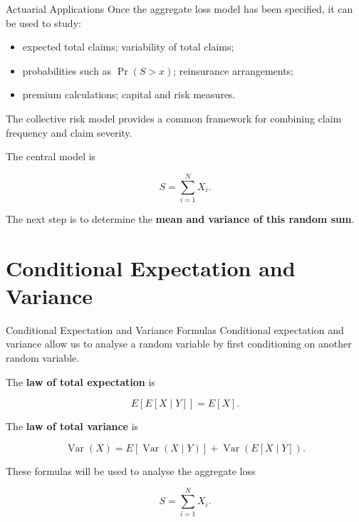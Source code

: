 \documentclass[
  ignorenonframetext,
  aspectratio=169,
]{beamer}
\providecommand{\tightlist}{%
  \setlength{\itemsep}{0pt}\setlength{\parskip}{0pt}}
\begin{document}
\begin{frame}{Actuarial Applications}
\protect{}\label{actuarial-applications}
Once the aggregate loss model has been specified, it can be used to
study:

\begin{itemize}
\tightlist
\item
  expected total claims; variability of total claims;
\item
  probabilities such as \(\Pr(S>x)\); reinsurance arrangements;
\item
  premium calculations; capital and risk measures.
\end{itemize}

The collective risk model provides a common framework for combining
claim frequency and claim severity.

\begin{tcolorbox}[enhanced jigsaw, arc=.35mm, bottomrule=.15mm, bottomtitle=1mm, breakable, colback=white, colbacktitle=quarto-callout-note-color!10!white, colframe=quarto-callout-note-color-frame, coltitle=black, left=2mm, leftrule=.75mm, opacityback=0, opacitybacktitle=0.6, rightrule=.15mm, title=\textcolor{quarto-callout-note-color}{\faInfo}\hspace{0.5em}{Key idea}, titlerule=0mm, toprule=.15mm, toptitle=1mm]

The central model is

\[
\boxed{S=\sum_{i=1}^{N}X_i}.
\]

The next step is to determine the \textbf{mean and variance of this
random sum}.

\end{tcolorbox}
\end{frame}

\section{Conditional Expectation and
Variance}\label{conditional-expectation-and-variance}

\begin{frame}{Conditional Expectation and Variance Formulas}
\protect{}\label{conditional-expectation-and-variance-formulas}
Conditional expectation and variance allow us to analyse a random
variable by first conditioning on another random variable.

The \textbf{law of total expectation} is

\[
\boxed{E[E[X\mid Y]]=E[X]}.
\]

The \textbf{law of total variance} is

\[
\boxed{
\operatorname{Var}(X)
=
E[\operatorname{Var}(X\mid Y)]
+
\operatorname{Var}(E[X\mid Y])
}.
\]

These formulas will be used to analyse the aggregate loss

\[
S=\sum_{i=1}^{N}X_i.
\]
\end{frame}
\end{document}
